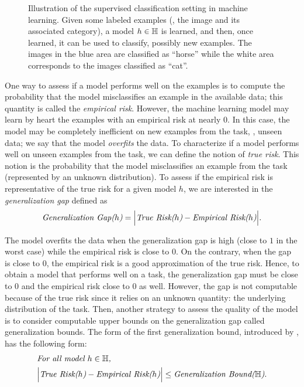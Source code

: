 \begin{figure}
  \centering
  
  \caption[Illustration of the Supervised Classification Setting in Machine Learning]{
  Illustration of the supervised classification setting in machine learning.
  Given some labeled examples (\ie, the image and its associated category), a model $h\in\mathbb{H}$ is learned, and then, once learned, it can be used to classify, possibly new examples.
  The images in the blue area are classified as ``horse'' while the white area corresponds to the images classified as ``cat''.
  }
  \label{chap:prelim:fig:setting}
\end{figure}

One way to assess if a model performs well on the examples is to compute the probability that the model misclassifies an example in the available data; this quantity is called the {\it empirical risk}.
However, the machine learning model may learn by heart the examples with an empirical risk at nearly $0$.
In this case, the model may be completely inefficient on new examples from the task, \ie, unseen data; we say that the model {\it overfits} the data.
To characterize if a model performs well on unseen examples from the task, we can define the notion of {\it true risk}.
This notion is the probability that the model misclassifies an example from the task (represented by an unknown distribution).
To assess if the empirical risk is representative of the true risk for a given model $h$, we are interested in the {\it generalization gap} defined as
\begin{align*}
  \text{{\it Generalization Gap($h$)}} = \Big| \text{{\it True Risk($h$)}} - \text{{\it Empirical Risk($h$)}}\Big|.
\end{align*}

The model overfits the data when the generalization gap is high (close to $1$ in the worst case) while the empirical risk is close to $0$.
On the contrary, when the gap is close to $0$, the empirical risk is a good approximation of the true risk.
Hence, to obtain a model that performs well on a task, the generalization gap must be close to $0$ and the empirical risk close to $0$ as well.
However, the gap is not computable because of the true risk since it relies on an unknown quantity: the underlying distribution of the task.
Then, another strategy to assess the quality of the model is to consider computable upper bounds on the generalization gap called generalization bounds.
The form of the first generalization bound, introduced by \citet{VapnikChervonenkis1968,VapnikChervonenkis1971,VapnikChervonenkis1974}, has the following form:
\begin{align*}
    &\text{{\it For all model $h \in \mathbb{H}$,}}\\
    &\Big| \text{{\it True Risk($h$)}} - \text{{\it Empirical Risk($h$)}}\Big| \le \text{{\it Generalization Bound($\mathbb{H}$)}}.
\end{align*}

